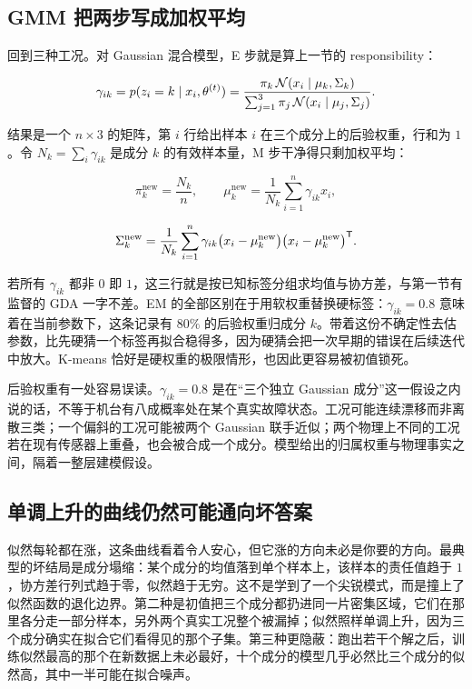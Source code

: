 \subsection{GMM 把两步写成加权平均}

回到三种工况。对 Gaussian 混合模型，E 步就是算上一节的 responsibility：

\[
\gamma_{ik}=p(z_i=k\mid x_i,\theta^{(t)})
=\frac{\pi_k\,\mathcal N(x_i\mid\mu_k,\Sigma_k)}
{\sum_{j=1}^3\pi_j\,\mathcal N(x_i\mid\mu_j,\Sigma_j)}.
\]

结果是一个 \(n\times3\) 的矩阵，第 \(i\) 行给出样本 \(i\) 在三个成分上的后验权重，行和为 \(1\)。令 \(N_k=\sum_i\gamma_{ik}\) 是成分 \(k\) 的有效样本量，M 步干净得只剩加权平均：

\[
\pi_k^{\text{new}}=\frac{N_k}{n},\qquad
\mu_k^{\text{new}}=\frac{1}{N_k}\sum_{i=1}^n\gamma_{ik}x_i,
\]

\[
\Sigma_k^{\text{new}}=\frac{1}{N_k}\sum_{i=1}^n\gamma_{ik}
\bigl(x_i-\mu_k^{\text{new}}\bigr)\bigl(x_i-\mu_k^{\text{new}}\bigr)^{\mathsf{T}}.
\]

若所有 \(\gamma_{ik}\) 都非 \(0\) 即 \(1\)，这三行就是按已知标签分组求均值与协方差，与第一节有监督的 GDA 一字不差。EM 的全部区别在于用软权重替换硬标签：\(\gamma_{ik}=0.8\) 意味着在当前参数下，这条记录有 \(80\%\) 的后验权重归成分 \(k\)。带着这份不确定性去估参数，比先硬猜一个标签再拟合稳得多，因为硬猜会把一次早期的错误在后续迭代中放大。K-means 恰好是硬权重的极限情形，也因此更容易被初值锁死。

后验权重有一处容易误读。\(\gamma_{ik}=0.8\) 是在``三个独立 Gaussian 成分''这一假设之内说的话，不等于机台有八成概率处在某个真实故障状态。工况可能连续漂移而非离散三类；一个偏斜的工况可能被两个 Gaussian 联手近似；两个物理上不同的工况若在现有传感器上重叠，也会被合成一个成分。模型给出的归属权重与物理事实之间，隔着一整层建模假设。

\subsection{单调上升的曲线仍然可能通向坏答案}

似然每轮都在涨，这条曲线看着令人安心，但它涨的方向未必是你要的方向。最典型的坏结局是成分塌缩：某个成分的均值落到单个样本上，该样本的责任值趋于 \(1\)，协方差行列式趋于零，似然趋于无穷。这不是学到了一个尖锐模式，而是撞上了似然函数的退化边界。第二种是初值把三个成分都扔进同一片密集区域，它们在那里各分走一部分样本，另外两个真实工况整个被漏掉；似然照样单调上升，因为三个成分确实在拟合它们看得见的那个子集。第三种更隐蔽：跑出若干个解之后，训练似然最高的那个在新数据上未必最好，十个成分的模型几乎必然比三个成分的似然高，其中一半可能在拟合噪声。

